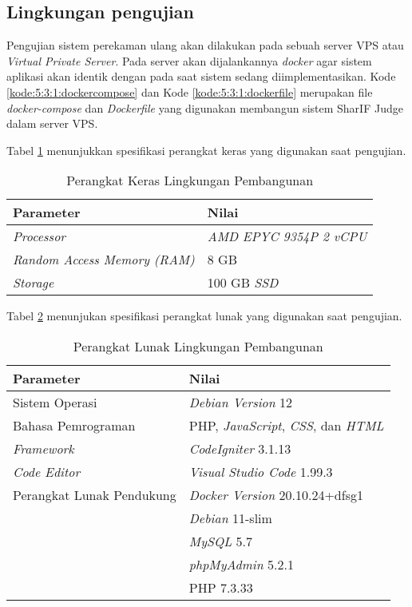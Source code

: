 \subsection{Lingkungan pengujian}
Pengujian sistem perekaman ulang akan dilakukan pada sebuah server VPS atau \textit{Virtual Private Server}. Pada server akan dijalankannya \textit{docker} agar sistem aplikasi akan identik dengan pada saat sistem sedang diimplementasikan. Kode \ref{kode:5:3:1:dockercompose} dan Kode \ref{kode:5:3:1:dockerfile} merupakan file \textit{docker-compose} dan \textit{Dockerfile} yang digunakan membangun sistem SharIF Judge dalam server VPS.

Tabel \ref{tab:5:1:keraspembangunan} menunjukkan spesifikasi perangkat keras yang digunakan saat pengujian.
\begin{table}[H]
    \caption{Perangkat Keras Lingkungan Pembangunan}
    \label{tab:5:1:keraspembangunan}
    \centering
    \begin{tabular}{|l|l|}
        \hline
        \textbf{Parameter}                  & \textbf{Nilai}              \\ \hline
        \textit{Processor}                  & \textit{AMD EPYC 9354P 2 vCPU} \\ \hline
        \textit{Random Access Memory (RAM)} & 8 GB                       \\ \hline
        \textit{Storage}                    & 100 GB \textit{SSD}           \\ \hline
    \end{tabular}
\end{table}

Tabel \ref{tab:5:2:1:lunakpembangunan} menunjukan spesifikasi perangkat lunak yang digunakan saat pengujian.

\begin{table}[H]
    \caption{Perangkat Lunak Lingkungan Pembangunan}
    \label{tab:5:2:1:lunakpembangunan}
    \centering
    \begin{tabular}{|l|l|}
        \hline
        \textbf{Parameter}        & \textbf{Nilai}                                            \\ \hline
        Sistem Operasi            & \textit{Debian Version} 12     \\ \hline
        Bahasa Pemrograman        & PHP, \textit{JavaScript}, \textit{CSS}, dan \textit{HTML} \\ \hline
        \textit{Framework}        & \textit{CodeIgniter} 3.1.13                               \\ \hline
        \textit{Code Editor}      & \textit{Visual Studio Code} 1.99.3                        \\ \hline
        Perangkat Lunak Pendukung & \textit{Docker Version} 20.10.24+dfsg1                            \\ & \textit{Debian} 11-slim \\ & \textit{MySQL} 5.7 \\ & \textit{phpMyAdmin} 5.2.1 \\ & PHP 7.3.33\\ \hline
    \end{tabular}
\end{table}

